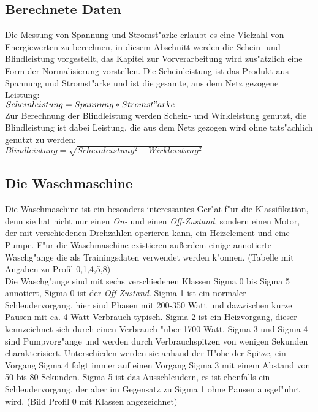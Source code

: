 \subsection{Berechnete Daten}
\label{Berechnete Daten}

Die Messung von Spannung und Stromst"arke erlaubt es eine Vielzahl von Energiewerten zu berechnen, in diesem Abschnitt werden die Schein- und Blindleistung vorgestellt, das Kapitel zur Vorverarbeitung wird zus"atzlich eine Form der Normalisierung vorstellen. 
Die Scheinleistung ist das Produkt aus Spannung und Stromst"arke und ist die gesamte, aus dem Netz gezogene Leistung:\\ $Scheinleistung = Spannung * Stromst"arke$\\[0.5cm]
Zur Berechnung der Blindleistung werden Schein- und Wirkleistung genutzt, die Blindleistung ist dabei Leistung, die aus dem Netz gezogen wird ohne tats"achlich genutzt zu werden:\\ $Blindleistung = \sqrt{Scheinleistung^2 - Wirkleistung^2}$ \\


\subsection{Die Waschmaschine}
\label{Die Waschmaschine}

Die Waschmaschine ist ein besonders interessantes Ger"at f"ur die Klassifikation, denn sie hat nicht nur einen \textit{On-} und einen \textit{Off-Zustand}, sondern einen Motor, der mit verschiedenen Drehzahlen operieren kann, ein Heizelement und eine Pumpe. F"ur die Waschmaschine existieren au{\ss}erdem einige annotierte Waschg"ange die als Trainingsdaten verwendet werden k"onnen. (Tabelle mit Angaben zu Profil 0,1,4,5,8)\\
Die Waschg"ange sind mit sechs verschiedenen Klassen Sigma 0 bis Sigma 5 annotiert, Sigma 0 ist der \textit{Off-Zustand}. Sigma 1 ist ein normaler Schleudervorgang, hier sind Phasen mit 200-350 Watt und dazwischen kurze Pausen mit ca. 4 Watt Verbrauch typisch.
Sigma 2 ist ein Heizvorgang, dieser kennzeichnet sich durch einen Verbrauch "uber 1700 Watt.
Sigma 3 und Sigma 4 sind Pumpvorg"ange und werden durch Verbrauchspitzen von wenigen Sekunden charakterisiert. Unterschieden werden sie anhand der H"ohe der Spitze, ein Vorgang Sigma 4 folgt immer auf einen Vorgang Sigma 3 mit einem Abstand von 50 bis 80 Sekunden.
Sigma 5 ist das Ausschleudern, es ist ebenfalls ein Schleudervorgang, der aber im Gegensatz zu Sigma 1 ohne Pausen ausgef"uhrt wird. (Bild Profil 0 mit Klassen angezeichnet)

